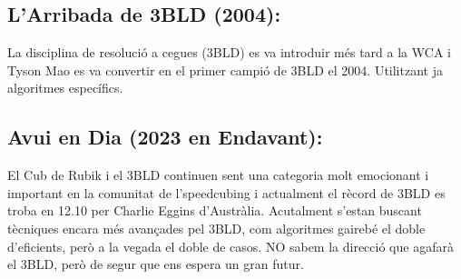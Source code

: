 \subsection{L'Arribada de 3BLD (2004):}

La disciplina de resolució a cegues (3BLD) es va introduir més tard a la WCA i Tyson Mao es va convertir en el primer campió de 3BLD el 2004. Utilitzant ja algoritmes específics.

\subsection{Avui en Dia (2023 en Endavant):}

El Cub de Rubik i el 3BLD continuen sent una categoria molt emocionant i important en la comunitat de l'speedcubing i actualment el rècord de 3BLD es troba en 12.10 per Charlie Eggins d'Austràlia. Acutalment s'estan buscant tècniques encara més avançades pel 3BLD, com algoritmes gairebé el doble d'eficients, però a la vegada el doble de casos. NO sabem la direcció que agafarà el 3BLD, però de segur que ens espera un gran futur.




